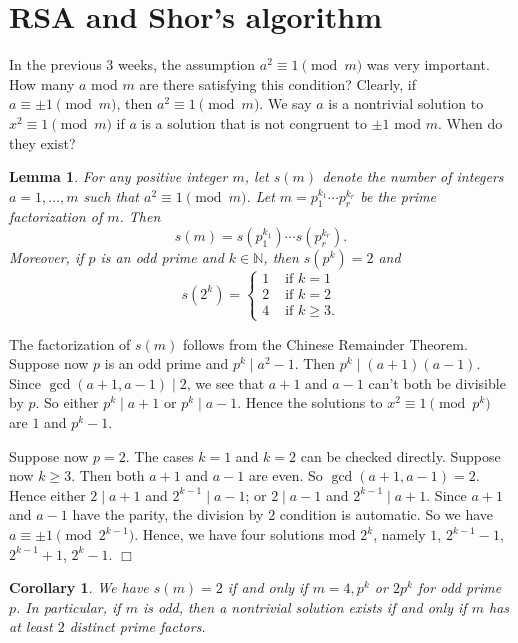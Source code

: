 \documentclass{article}
\def\N{{\mathbb N}}
\newtheorem{cor}[subsection]{Corollary}
\newtheorem{lemma}[subsection]{Lemma}
\newenvironment{proof}{\noindent {\bf Proof:}}{$\Box$ \vspace{2 ex}}
\begin{document}
\section{RSA and Shor's algorithm}

In the previous 3 weeks, the assumption $a^2\equiv 1\pmod{m}$ was very important. How many $a$ mod $m$ are there satisfying this condition? Clearly, if $a\equiv \pm1\pmod{m}$, then $a^2\equiv 1\pmod{m}$. We say $a$ is a nontrivial solution to $x^2\equiv 1\pmod{m}$ if $a$ is a solution that is not congruent to $\pm1$ mod $m$. When do they exist?

\begin{lemma}
    For any positive integer $m$, let $s(m)$ denote the number of integers $a =1,\ldots, m$ such that $a^2\equiv 1\pmod{m}$. Let $m = p_1^{k_1}\cdots p_r^{k_r}$ be the prime factorization of $m$. Then
    $$s(m) = s(p_1^{k_1})\cdots s(p_r^{k_r}).$$
    Moreover, if $p$ is an odd prime and $k\in\N$, then $s(p^k) = 2$ and
    $$s(2^k) = \begin{cases}
        1&\mbox{ if }k=1\\
        2&\mbox{ if }k=2\\
        4&\mbox{ if }k\geq3.
    \end{cases}$$
\end{lemma}

\begin{proof}
    The factorization of $s(m)$ follows from the Chinese Remainder Theorem. Suppose now $p$ is an odd prime and $p^k\mid a^2 - 1$. Then $p^k\mid (a+1)(a-1)$. Since $\gcd(a+1,a-1)\mid 2$, we see that $a+1$ and $a-1$ can't both be divisible by $p$. So either $p^k\mid a+1$ or $p^k\mid a-1$. Hence the solutions to $x^2\equiv 1\pmod{p^k}$ are $1$ and $p^k-1$.

    Suppose now $p = 2$. The cases $k = 1$ and $k=2$ can be checked directly. Suppose now $k\geq 3$. Then both $a+1$ and $a-1$ are even. So $\gcd(a+1, a-1) = 2$. Hence either $2\mid a+1$ and $2^{k-1}\mid a-1$; or $2\mid a-1$ and $2^{k-1}\mid a+1$. Since $a+1$ and $a-1$ have the parity, the division by $2$ condition is automatic. So we have $a\equiv\pm1\pmod{2^{k-1}}.$ Hence, we have four solutions mod $2^k$, namely $1$, $2^{k-1}-1$, $2^{k-1}+1$, $2^k-1$.
\end{proof}

\begin{cor}
    We have $s(m) = 2$ if and only if $m = 4, p^k$ or $2p^k$ for odd prime $p$. In particular, if $m$ is odd, then a nontrivial solution exists if and only if $m$ has at least $2$ distinct prime factors.
\end{cor}
\end{document}
